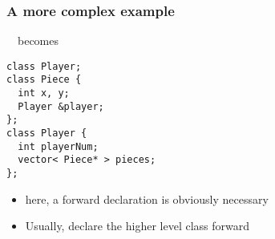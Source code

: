 \documentclass{slides}
\begin{document}
\begin{frame}[fragile]
  \frametitle{A more complex example}

  ~~becomes
  \medskip

\begin{lstlisting}
class Player;
class Piece {
  int x, y;
  Player &player;
};
class Player {
  int playerNum;
  vector< Piece* > pieces;
};
\end{lstlisting}

  \begin{itemize}
  \item here, a forward declaration is obviously necessary
  \item Usually, declare the higher level class forward
  \end{itemize}
\end{frame}
\end{document}
